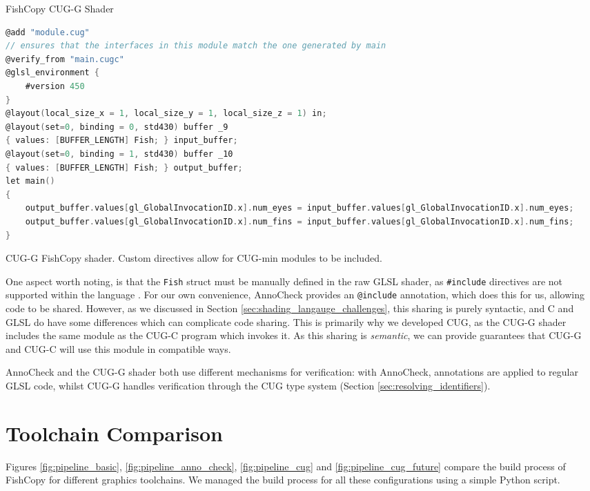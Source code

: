 \documentclass[a4paper,12pt,twoside,openright]{report}
\begin{document}
\begin{lstfloat}
\begin{center}
FishCopy CUG-G Shader
\end{center}
\begin{lstlisting}[language=C]
@add "module.cug"
// ensures that the interfaces in this module match the one generated by main
@verify_from "main.cugc"
@glsl_environment {
    #version 450
}
@layout(local_size_x = 1, local_size_y = 1, local_size_z = 1) in;
@layout(set=0, binding = 0, std430) buffer _9
{ values: [BUFFER_LENGTH] Fish; } input_buffer;
@layout(set=0, binding = 1, std430) buffer _10
{ values: [BUFFER_LENGTH] Fish; } output_buffer;
let main()
{
    output_buffer.values[gl_GlobalInvocationID.x].num_eyes = input_buffer.values[gl_GlobalInvocationID.x].num_eyes;
    output_buffer.values[gl_GlobalInvocationID.x].num_fins = input_buffer.values[gl_GlobalInvocationID.x].num_fins;
}
\end{lstlisting}
\caption{CUG-G FishCopy shader. Custom directives allow for CUG-min modules to
be included. }
\label{lst:cug_g_shader}
\end{lstfloat}

One aspect worth noting, is that the \texttt{Fish} struct must be manually
defined in the raw GLSL shader, as \texttt{\#include} directives are not
supported within the language \cite{NoIncludeGLSL}. For our own convenience,
AnnoCheck provides an \texttt{@include} annotation, which does this for us,
allowing code to be shared. However, as we discussed in Section
\ref{sec:shading_langauge_challenges}, this sharing is purely syntactic, and C
and GLSL do have some differences which can complicate code sharing. This is
primarily why we developed CUG, as the CUG-G shader includes the same module as
the CUG-C program which invokes it. As this sharing is \textit{semantic}, we
can provide guarantees that CUG-G and CUG-C will use this module in compatible
ways.

AnnoCheck and the CUG-G shader both use different mechanisms for verification:
with AnnoCheck, annotations are applied to regular GLSL code, whilst CUG-G
handles verification through the CUG type system (Section
\ref{sec:resolving_identifiers}).

\section{Toolchain Comparison}

\label{sec:toolchain_comparison}

Figures \ref{fig:pipeline_basic}, \ref{fig:pipeline_anno_check},
\ref{fig:pipeline_cug} and \ref{fig:pipeline_cug_future} compare the build
process of FishCopy for different graphics toolchains. We managed the build
process for all these configurations using a simple Python script.
\end{document}
